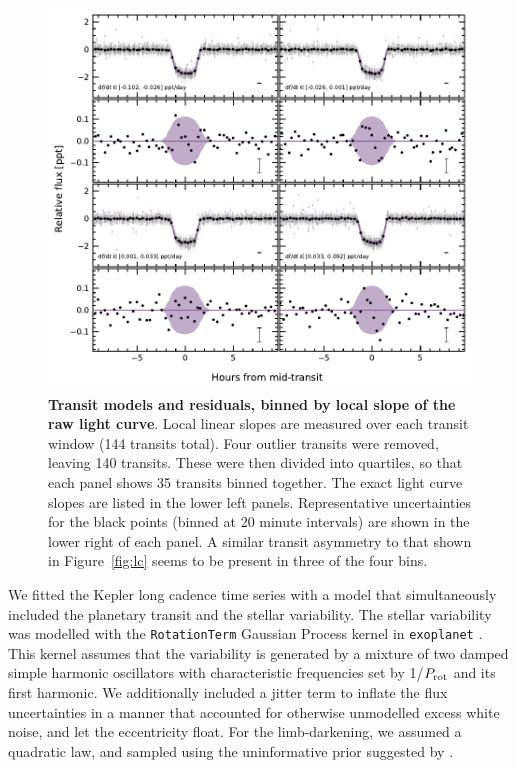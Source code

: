 \documentclass[12pt,modern,twocolumn,tighten]{aastex63}
\begin{document}
\begin{figure}[t]
	\begin{center}
		\leavevmode
		\includegraphics[width=\textwidth]{f19.pdf}
	\end{center}
	\vspace{-0.7cm}
	\caption{
    {\bf Transit models and residuals, binned by local slope of the
    raw light curve}.  Local linear slopes are measured over each
    transit window (144 transits total).  Four outlier transits were
    removed, leaving 140 transits.  These were then divided into
    quartiles, so that each panel shows 35 transits binned together.
    The exact light curve slopes are listed in the lower left panels.
    Representative uncertainties for the black points (binned at 20
    minute intervals) are shown in the lower right of each panel.  A
    similar transit asymmetry to that shown in Figure~\ref{fig:lc}
    seems to be present in three of the four bins.
		\label{fig:phaseslope}
	}
\end{figure}



We fitted the Kepler long cadence time series with a model that
simultaneously included the planetary transit and the stellar
variability.  The stellar variability was modelled with the
\texttt{RotationTerm} Gaussian Process kernel in \texttt{exoplanet}
\citep{exoplanet:exoplanet}.  This kernel assumes that the variability
is generated by a mixture of two damped simple harmonic oscillators
with characteristic frequencies set by 1/$P_{\rm rot}$ and its first
harmonic.  We additionally included a jitter term to inflate
the flux uncertainties in a manner that accounted for otherwise
unmodelled excess white noise, and let the eccentricity float.  For
the limb-darkening, we assumed a quadratic law, and sampled using the
uninformative prior suggested by \citet{exoplanet:kipping13}.
\end{document}
